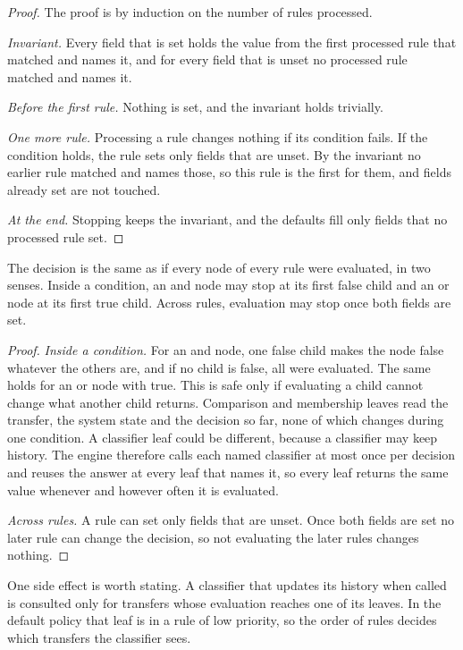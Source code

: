 \begin{proof}
The proof is by induction on the number of rules processed.

\emph{Invariant.} Every field that is set holds the value from the first
processed rule that matched and names it, and for every field that is unset
no processed rule matched and names it.

\emph{Before the first rule.} Nothing is set, and the invariant holds
trivially.

\emph{One more rule.} Processing a rule changes nothing if its condition
fails. If the condition holds, the rule sets only fields that are unset. By
the invariant no earlier rule matched and names those, so this rule is the
first for them, and fields already set are not touched.

\emph{At the end.} Stopping keeps the invariant, and the defaults fill only
fields that no processed rule set.
\end{proof}

\begin{proposition}
\label{prop:earlystop}%
The decision is the same as if every node of every rule were evaluated, in
two senses. Inside a condition, an and node may stop at its first false
child and an or node at its first true child. Across rules, evaluation may
stop once both fields are set.
\end{proposition}

\begin{proof}
\emph{Inside a condition.} For an and node, one false child makes the node
false whatever the others are, and if no child is false, all were evaluated.
The same holds for an or node with true. This is safe only if evaluating a
child cannot change what another child returns. Comparison and membership
leaves read the transfer, the system state and the decision so far, none of
which changes during one condition. A classifier leaf could be different,
because a classifier may keep history. The engine therefore calls each named
classifier at most once per decision and reuses the answer at every leaf
that names it, so every leaf returns the same value whenever and however
often it is evaluated.

\emph{Across rules.} A rule can set only fields that are unset. Once both
fields are set no later rule can change the decision, so not evaluating the
later rules changes nothing.
\end{proof}

One side effect is worth stating. A classifier that updates its history when
called is consulted only for transfers whose evaluation reaches one of its
leaves. In the default policy that leaf is in a rule of low priority, so the
order of rules decides which transfers the classifier sees.

